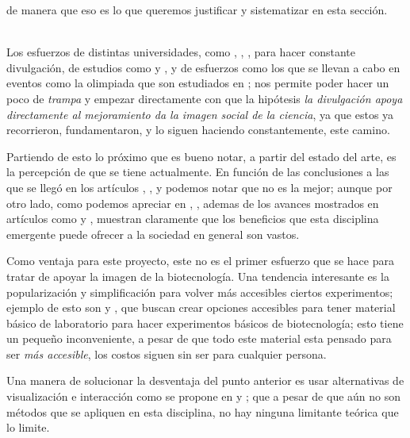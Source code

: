 \documentclass[12pt]{article}
\begin{document}
	\noindent de manera que eso es lo que queremos justificar y sistematizar en esta sección.
	\ \\ \
	\par Los esfuerzos de distintas universidades,  como \cite{UG}, \cite{UdG}, \cite{unam}, para hacer constante divulgación, de estudios como \cite{utilidad congresos} y \cite{CC}, y de esfuerzos como los que se llevan a cabo en eventos como la olimpiada que son estudiados en \cite{olimpiadas}; nos permite poder hacer un poco de \textit{trampa} y empezar directamente con que la hipótesis \textit{la divulgación apoya directamente al mejoramiento da la imagen social de la ciencia}, ya que estos ya recorrieron, fundamentaron, y lo siguen haciendo constantemente, este camino.
	\par Partiendo de esto lo próximo que es bueno notar, a partir del estado del arte, es la percepción de que se tiene actualmente. En función de las conclusiones a las que se llegó en los artículos \cite{bio en espania}, \cite{a}, \cite{biot mexico} y \cite{b} podemos notar que no es la mejor; aunque por otro lado, como podemos apreciar en \cite{biohacker}, \cite{usos}, ademas de los avances mostrados en artículos como  \cite{genetica en colombia} y \cite{socializacion}, muestran claramente que los beneficios que esta disciplina emergente puede ofrecer a la sociedad en general son vastos.
	\par Como ventaja para este proyecto, este no es el primer esfuerzo que se hace para tratar de apoyar la imagen de la biotecnología. Una tendencia interesante es la popularización y simplificación para volver más accesibles ciertos experimentos; ejemplo de esto son \cite{kits} y \cite{kits2}, que buscan crear opciones accesibles para tener material básico de laboratorio para hacer experimentos básicos de biotecnología; esto tiene un pequeño inconveniente, a pesar de que todo este material esta pensado para ser \textit{más accesible}, los costos siguen sin ser para cualquier persona. 
	\par Una manera de solucionar la desventaja del punto anterior es usar alternativas de visualización e interacción como se propone en \cite{vr} y \cite{vr2}; que a pesar de que aún no son métodos que se apliquen en esta disciplina, no hay ninguna limitante teórica que lo limite.
\end{document}
